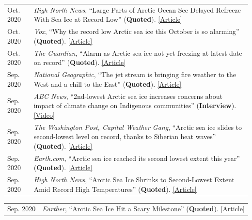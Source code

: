 \documentclass[margin,line,palatino,courier,10pt]{res}
\begin{document}
\begin{resume}
\begin{tabular}{@{}p{0.9in}p{4in}}
Oct. 2020 & \textit{High North News}, ``Large Parts of Arctic Ocean See Delayed Refreeze With Sea Ice at Record Low'' (\textbf{Quoted}). \href{https://www.highnorthnews.com/en/large-parts-arctic-ocean-see-delayed-refreeze-sea-ice-record-low}{[Article]}\\
Oct. 2020 & \textit{Vox}, ``Why the record low Arctic sea ice this October is so alarming'' (\textbf{Quoted}). \href{https://www.vox.com/21536859/arctic-sea-ice-2020-climate-change-alaska-polar-bears-charts}{[Article]}\\
Oct. 2020 & \textit{The Guardian}, ``Alarm as Arctic sea ice not yet freezing at latest date on record'' (\textbf{Quoted}). \href{https://www.theguardian.com/world/2020/oct/22/alarm-as-arctic-sea-ice-not-yet-freezing-at-latest-date-on-record}{[Article]}\\
Sep. 2020 & \textit{National Geographic}, ``The jet stream is bringing fire weather to the West and a chill to the East'' (\textbf{Quoted}). \href{https://www.nationalgeographic.com/science/2020/09/jet-stream-fire-weather-california-chill-eastern-us/}{[Article]}\\
Sep. 2020 & \textit{ABC News}, ``2nd-lowest Arctic sea ice increases concerns about impact of climate change on Indigenous communities'' (\textbf{Interview}). \href{https://abcnews.go.com/International/2nd-lowest-arctic-sea-ice-increases-concerns-impact/story?id=73224755}{[Video]}\\
Sep. 2020 & \textit{The Washington Post, Capital Weather Gang}, ``Arctic sea ice slides to second-lowest level on record, thanks to Siberian heat waves'' (\textbf{Quoted}). \href{https://www.washingtonpost.com/weather/2020/09/22/arctic-sea-ice-low/}{[Article]}\\
Sep. 2020 & \textit{Earth.com}, ``Arctic sea ice reached its second lowest extent this year'' (\textbf{Quoted}). \href{https://www.earth.com/news/arctic-sea-ice-reached-its-second-lowest-extent-this-year/}{[Article]}\\
Sep. 2020 & \textit{High North News}, ``Arctic Sea Ice Shrinks to Second-Lowest Extent Amid Record High Temperatures'' (\textbf{Quoted}). \href{https://www.highnorthnews.com/en/arctic-sea-ice-shrinks-second-lowest-extent-amid-record-high-temperatures}{[Article]}\\
\end{tabular}
\begin{tabular}{@{}p{0.9in}p{4in}}
Sep. 2020 & \textit{Earther}, ``Arctic Sea Ice Hit a Scary Milestone'' (\textbf{Quoted}). \href{https://earther.gizmodo.com/arctic-sea-ice-hit-a-scary-milestone-1845133739}{[Article]}\\

\end{tabular}
\end{resume}
\end{document}
